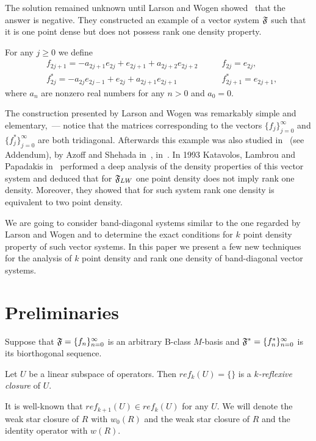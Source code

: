 \documentclass[12pt]{amsart}
\theoremstyle{case}
\begin{document}
    The solution remained unknown until Larson and Wogen showed~\cite{larson} that the answer is negative.
    They constructed an example of a vector system $\mathfrak{F}$ such that it is one point dense but does not possess rank one density property.
    \begin{example}
      \label{lw-sys}
      For any $j \geq 0$ we define
      \begin{align*}
        &f_{2j+1}=-a_{2j+1}e_{2j} + e_{2j+1} + a_{2j+2}e_{2j+2} \qquad &f_{2j}=e_{2j},\\
        &f^*_{2j}=-a_{2j}e_{2j-1} + e_{2j} + a_{2j+1}e_{2j+1} \qquad &f^*_{2j+1}=e_{2j+1},
      \end{align*}
      where $a_n$ are nonzero real numbers for any $n > 0$ and $a_0 = 0$.
    \end{example}
    The construction presented by Larson and Wogen was remarkably simple and elementary,~--- notice that the matrices corresponding to
      the vectors $\{f_j\}_{j=0}^\infty$ and $\{f^*_j\}_{j=0}^\infty$ are both tridiagonal.
    Afterwards this example was also studied in~\cite{argyroslambrou} (see Addendum), by Azoff and Shehada in~\cite{azoff}, in~\cite{me1}.
    In 1993 Katavolos, Lambrou and Papadakis in~\cite{katavolos} performed a deep analysis of the density properties
      of this vector system and deduced that for $\mathfrak{F}_{LW}$ one point density does not imply rank one density.
    Moreover, they showed that for such system rank one density is equivalent to two point density.

    We are going to consider band-diagonal systems similar to the one regarded by Larson and Wogen and to determine the exact conditions
      for $k$ point density property of such vector systems.
    In this paper we present a few new techniques for the analysis of $k$ point density and rank one density of band-diagonal vector systems.

\section{Preliminaries}
  \label{sec:preliminaries}
  Suppose that $\mathfrak{F}=\{f_n\}_{n=0}^\infty$ is an arbitrary B-class $M$-basis and
    $\mathfrak{F^{*}} = \{f^*_n\}_{n=0}^\infty$ is its biorthogonal sequence.

  \begin{definition}
    Let $U$ be a linear subspace of operators. Then $ref_k(U) = \{ \}$ is a \emph{$k$-reflexive closure} of $U$.
  \end{definition}
  It is well-known that $ref_{k + 1}(U) \in ref_k(U)$ for any $U$.
  We will denote the weak star closure of $R$ with $w_0(R)$ and the weak star closure of $R$ and the identity operator with $w(R)$.
\end{document}
